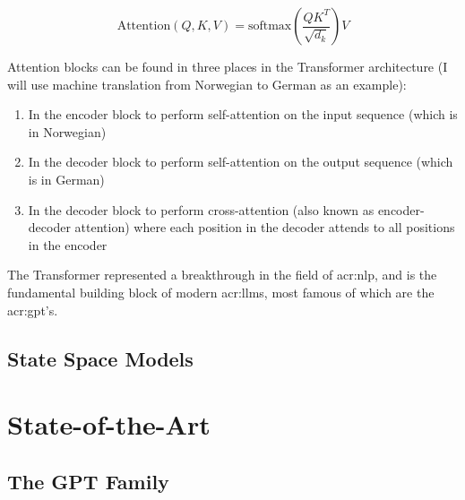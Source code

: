 \begin{equation}
    \text{Attention}(Q, K, V) = \text{softmax}\left(\frac{QK^T}{\sqrt{d_k}}\right)V
    \label{eq:attention}
\end{equation}

Attention blocks can be found in three places in the Transformer architecture \citep[5]{vaswaniAttentionAllYou2017} (I will use machine translation from Norwegian to German as an example):

\begin{enumerate}
    \item In the encoder block to perform self-attention on the input sequence (which is in Norwegian)
    \item In the decoder block to perform self-attention on the output sequence (which is in German)
    \item In the decoder block to perform cross-attention (also known as encoder-decoder attention) where each position in the decoder attends to all positions in the encoder
\end{enumerate}

The Transformer represented a breakthrough in the field of \gls{acr:nlp}, and is the fundamental building block of modern \glspl{acr:llm}, most famous of which are the \acrshort{acr:gpt}'s.

\subsection{State Space Models}
\label{subsec:state-space-models}

\section[State-of-the-Art Large Language Models]{State-of-the-Art }

\subsection{The GPT Family}
\label{subsec:the-gpt-family}


